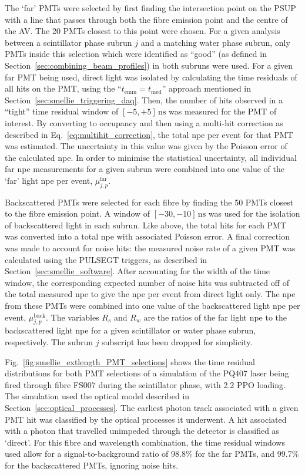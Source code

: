 The `far' PMTs were selected by first finding the intersection point on the PSUP with a line that passes through both the fibre emission point and the centre of the AV. The 20 PMTs closest to this point were chosen. For a given analysis between a scintillator phase subrun $j$ and a matching water phase subrun, only PMTs inside this selection which were identified as ``good'' (as defined in Section~\ref{sec:combining_beam_profiles}) in both subruns were used. For a given far PMT being used, direct light was isolated by calculating the time residuals of all hits on the PMT, using the ``$t_{\mathrm{emm}} = t_{\mathrm{med}}$'' approach mentioned in Section~\ref{sec:smellie_triggering_daq}. Then, the number of hits observed in a ``tight'' time residual window of $[-5,+5]\,\si{\ns}$ was measured for the PMT of interest. By converting to occupancy and then using a multi-hit correction as described in Eq.~\ref{eq:multihit_correction}, the total npe per event for that PMT was estimated. The uncertainty in this value was given by the Poisson error of the calculated npe. In order to minimise the statistical uncertainty, all individual far npe measurements for a given subrun were combined into one value of the `far' light npe per event, $\mu_{j,p}^{\mathrm{far}}$.

Backscattered PMTs were selected for each fibre by finding the 50 PMTs closest to the fibre emission point. A \tres{} window of $[-30,-10]\,\si{\ns}$ was used for the isolation of backscattered light in each subrun. Like above, the total hits for each PMT was converted into a total npe with associated Poisson error. A final correction was made to account for noise hits: the measured noise rate of a given PMT was calculated using the PULSEGT triggers, as described in Section~\ref{sec:smellie_software}. After accounting for the width of the time window, the corresponding expected number of noise hits was subtracted off of the total measured npe to give the npe per event from direct light only. The npe from these PMTs were combined into one value of the backscattered light npe per event, $\mu_{j,p}^{\mathrm{back}}$. The variables $R_{s}$ and $R_{w}$ are the ratios of the far light npe to the backscattered light npe for a given scintillator or water phase subrun, respectively. The subrun $j$ subscript has been dropped for simplicity.

Fig.~\ref{fig:smellie_extlength_PMT_selections} shows the time residual distributions for both PMT selections of a simulation of the PQ407 laser being fired through fibre FS007 during the scintillator phase, with \SI{2.2}{\gpl} PPO loading. The simulation used the optical model described in Section~\ref{sec:optical_processes}. The earliest photon track associated with a given PMT hit was classified by the optical processes it underwent. A hit associated with a photon that travelled unimpeded through the detector is classified as `direct'. For this fibre and wavelength combination, the time residual windows used allow for a signal-to-background ratio of 98.8\% for the far PMTs, and 99.7\% for the backscattered PMTs, ignoring noise hits.

